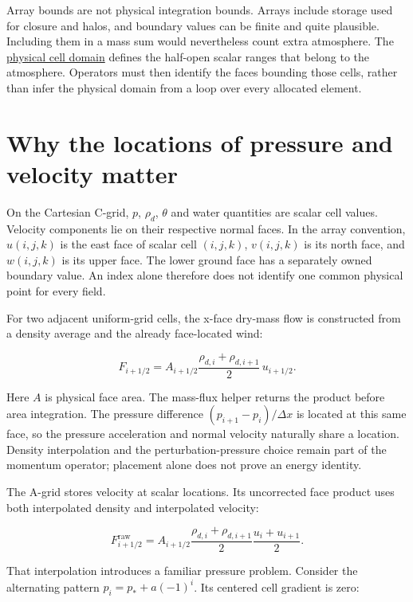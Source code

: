 \documentclass[
  11pt,
]{report}
\begin{document}
Array bounds are not physical integration bounds. Arrays include storage
used for closure and halos, and boundary values can be finite and quite
plausible. Including them in a mass sum would nevertheless count extra
atmosphere. The
\href{../include/core/infra/physical_cell_domain.hpp}{physical cell
domain} defines the half-open scalar ranges that belong to the
atmosphere. Operators must then identify the faces bounding those cells,
rather than infer the physical domain from a loop over every allocated
element.



\section{Why the locations of pressure and velocity
matter}\label{why-the-locations-of-pressure-and-velocity-matter}

On the Cartesian C-grid, \(p\), \(\rho_d\), \(\theta\) and water
quantities are scalar cell values. Velocity components lie on their
respective normal faces. In the array convention, \(u(i,j,k)\) is the
east face of scalar cell \((i,j,k)\), \(v(i,j,k)\) is its north face,
and \(w(i,j,k)\) is its upper face. The lower ground face has a
separately owned boundary value. An index alone therefore does not
identify one common physical point for every field.

For two adjacent uniform-grid cells, the x-face dry-mass flow is
constructed from a density average and the already face-located wind:

\[F_{i+1/2}=A_{i+1/2}
\frac{\rho_{d,i}+\rho_{d,i+1}}{2}\,u_{i+1/2}.\]

Here \(A\) is physical face area. The mass-flux helper returns the
product before area integration. The pressure difference
\((p_{i+1}-p_i)/\Delta x\) is located at this same face, so the pressure
acceleration and normal velocity naturally share a location. Density
interpolation and the perturbation-pressure choice remain part of the
momentum operator; placement alone does not prove an energy identity.

The A-grid stores velocity at scalar locations. Its uncorrected face
product uses both interpolated density and interpolated velocity:

\[F^{\mathrm{raw}}_{i+1/2}
=A_{i+1/2}\frac{\rho_{d,i}+\rho_{d,i+1}}{2}
                    \frac{u_i+u_{i+1}}{2}.\]

That interpolation introduces a familiar pressure problem. Consider the
alternating pattern \(p_i=p_*+a(-1)^i\). Its centered cell gradient is
zero:
\end{document}
